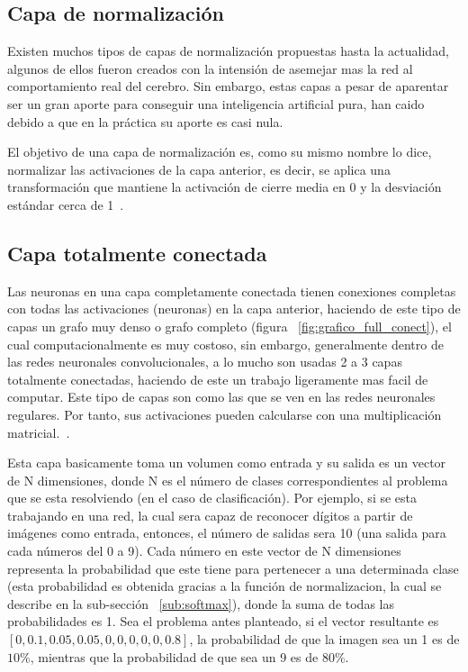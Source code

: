 \subsection{Capa de normalización}
Existen muchos tipos de capas de normalización propuestas hasta la actualidad, algunos de ellos fueron creados con la intensión de asemejar mas la red al comportamiento real del cerebro. Sin embargo, estas capas a pesar de aparentar ser un gran aporte para conseguir una inteligencia artificial pura, han caido debido a que en la práctica su aporte es casi nula. 

El objetivo de una capa de normalización es, como su mismo nombre lo dice, normalizar las activaciones de la capa anterior, es decir, se aplica una transformación que mantiene la activación de cierre media en 0 y la desviación estándar cerca de 1~\cite{22RedesNeuronalesConvolu}.

\subsection{Capa totalmente conectada}
Las neuronas en una capa completamente conectada tienen conexiones completas con todas las activaciones (neuronas) en la capa anterior, haciendo de este tipo de capas un grafo muy denso o grafo completo (figura ~\ref{fig:grafico_full_conect}), el cual computacionalmente es muy costoso, sin embargo, generalmente dentro de las redes neuronales convolucionales, a lo mucho son usadas 2 a 3 capas totalmente conectadas, haciendo de este un trabajo ligeramente mas facil de computar. Este tipo de capas son como las que se ven en las redes neuronales regulares. Por tanto, sus activaciones pueden calcularse con una multiplicación matricial.~\cite{22RedesNeuronalesConvolu}.

Esta capa basicamente toma un volumen como entrada y su salida es un vector de N dimensiones, donde N es el número de clases correspondientes al problema que se esta resolviendo (en el caso de clasificación). Por ejemplo, si se esta trabajando en una red, la cual sera capaz de reconocer dígitos a partir de imágenes como entrada, entonces, el número de salidas sera 10 (una salida para cada números del 0 a 9). Cada número en este vector de N dimensiones representa la probabilidad que este tiene para pertenecer a una determinada clase (esta probabilidad es obtenida gracias a la función de normalizacion, la cual se describe en la sub-sección ~\ref{sub:softmax}), donde la suma de todas las probabilidades es 1. Sea el problema antes planteado, si el vector resultante es $[0, 0.1, 0.05 , 0.05, 0, 0, 0, 0, 0, 0.8]$, la probabilidad de que la imagen sea un 1 es de $10$\%, mientras que la probabilidad de que sea un 9 es de $80$\%.



